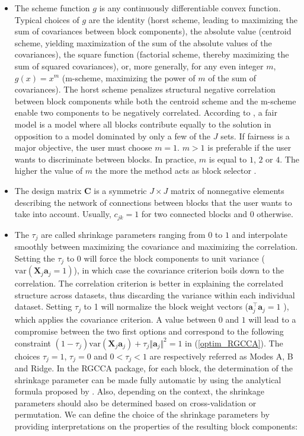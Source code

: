 \documentclass[
]{jss}
\begin{document}
\begin{itemize}
\item
  The scheme function \(g\) is any continuously differentiable convex
  function. Typical choices of \(g\) are the identity (horst scheme,
  leading to maximizing the sum of covariances between block
  components), the absolute value (centroid scheme, yielding
  maximization of the sum of the absolute values of the covariances),
  the square function (factorial scheme, thereby maximizing the sum of
  squared covariances), or, more generally, for any even integer \(m\),
  \(g(x) = x^m\) (m-scheme, maximizing the power of \(m\) of the sum of
  covariances). The horst scheme penalizes structural negative
  correlation between block components while both the centroid scheme
  and the m-scheme enable two components to be negatively correlated.
  According to \citep{VandeGeer1984}, a fair model is a model where all
  blocks contribute equally to the solution in opposition to a model
  dominated by only a few of the \(J\) sets. If fairness is a major
  objective, the user must choose \(m=1\). \(m>1\) is preferable if the
  user wants to discriminate between blocks. In practice, \(m\) is equal
  to \(1\), \(2\) or \(4\). The higher the value of \(m\) the more the
  method acts as block selector \citep{Tenenhaus2017}.
\item
  The design matrix \(\ensuremath{\mathbf{C}}\) is a symmetric
  \(J \times J\) matrix of nonnegative elements describing the network
  of connections between blocks that the user wants to take into
  account. Usually, \(c_{jk}=1\) for two connected blocks and 0
  otherwise.
\item
  The \(\tau_j\) are called shrinkage parameters ranging from \(0\) to
  \(1\) and interpolate smoothly between maximizing the covariance and
  maximizing the correlation. Setting the \(\tau_j\) to 0 will force the
  block components to unit variance
  (\(\mathrm{var}(\mathbf{X}_j\ensuremath{\mathbf{a}}_j = 1)\)), in
  which case the covariance criterion boils down to the correlation. The
  correlation criterion is better in explaining the correlated structure
  across datasets, thus discarding the variance within each individual
  dataset. Setting \(\tau_j\) to 1 will normalize the block weight
  vectors
  (\(\ensuremath{\mathbf{a}}_j^\top\ensuremath{\mathbf{a}}_j = 1\) ),
  which applies the covariance criterion. A value between \(0\) and
  \(1\) will lead to a compromise between the two first options and
  correspond to the following constraint
  \((1-\tau_j)\mathrm{var}(\mathbf{X}_j\ensuremath{\mathbf{a}}_j) + \tau_j \Vert \ensuremath{\mathbf{a}}_j \Vert^2 = 1\)
  in (\ref{optim_RGCCA}). The choices \(\tau_j = 1\), \(\tau_j = 0\) and
  \(0<\tau_j<1\) are respectively referred as Modes A, B and Ridge. In
  the RGCCA package, for each block, the determination of the shrinkage
  parameter can be made fully automatic by using the analytical formula
  proposed by \citep{Schafer2005}. Also, depending on the context, the
  shrinkage parameters should also be determined based on
  cross-validation or permutation. We can define the choice of the
  shrinkage parameters by providing interpretations on the properties of
  the resulting block components:


\end{itemize}
\end{document}
